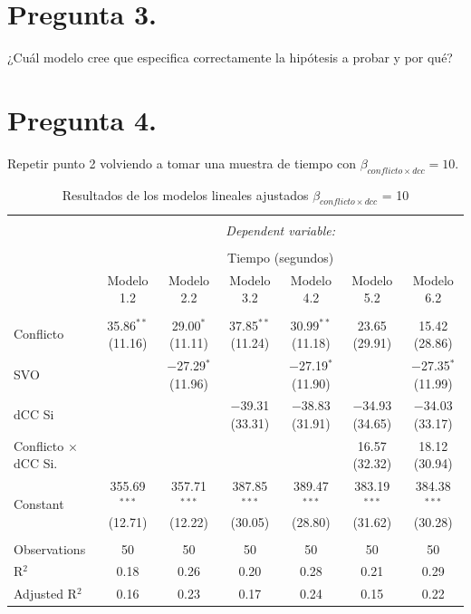 \documentclass[
  spanish,
  10pt,
]{article}
\begin{document}
\section{Pregunta 3.}\label{pregunta-3.}

¿Cuál modelo cree que especifica correctamente la hipótesis a probar y
por qué?

\section{Pregunta 4.}\label{pregunta-4.}

Repetir punto 2 volviendo a tomar una muestra de tiempo con
\(\beta_{conflicto \times dcc} = 10\).

\begin{table}[H] \centering 
  \caption{Resultados de los modelos lineales ajustados $\beta_{conflicto \times dcc}$ = 10} 
  \label{} 
\scriptsize 
\begin{tabular}{@{\extracolsep{5pt}}lcccccc} 
\\[-1.8ex]\hline 
\hline \\[-1.8ex] 
 & \multicolumn{6}{c}{\textit{Dependent variable:}} \\ 
\cline{2-7} 
\\[-1.8ex] & \multicolumn{6}{c}{Tiempo (segundos)} \\ 
 & Modelo 1.2 & Modelo 2.2 & Modelo 3.2 & Modelo 4.2 & Modelo 5.2 & Modelo 6.2 \\ 
\hline \\[-1.8ex] 
 Conflicto & 35.86$^{**}$ (11.16) & 29.00$^{*}$ (11.11) & 37.85$^{**}$ (11.24) & 30.99$^{**}$ (11.18) & 23.65 (29.91) & 15.42 (28.86) \\ 
  SVO &  & $-$27.29$^{*}$ (11.96) &  & $-$27.19$^{*}$ (11.90) &  & $-$27.35$^{*}$ (11.99) \\ 
  dCC Si &  &  & $-$39.31 (33.31) & $-$38.83 (31.91) & $-$34.93 (34.65) & $-$34.03 (33.17) \\ 
  Conflicto $\times$ dCC Si. &  &  &  &  & 16.57 (32.32) & 18.12 (30.94) \\ 
  Constant & 355.69$^{***}$ (12.71) & 357.71$^{***}$ (12.22) & 387.85$^{***}$ (30.05) & 389.47$^{***}$ (28.80) & 383.19$^{***}$ (31.62) & 384.38$^{***}$ (30.28) \\ 
 \hline \\[-1.8ex] 
Observations & 50 & 50 & 50 & 50 & 50 & 50 \\ 
R$^{2}$ & 0.18 & 0.26 & 0.20 & 0.28 & 0.21 & 0.29 \\ 
Adjusted R$^{2}$ & 0.16 & 0.23 & 0.17 & 0.24 & 0.15 & 0.22 \\ 

\end{tabular}
\end{table}
\end{document}
